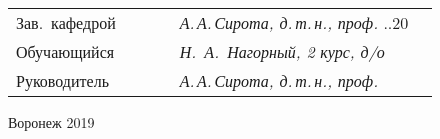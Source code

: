 \begin{titlepage}
\begin{arial}
\begin{tabularx}{\textwidth}{llllll}
Зав.~кафедрой & \hspace{0.2mm} & \underline{\hspace{25mm}} & \hspace{0.2mm} & \textit{А.\,А.\,Сирота, д.\,т.\,н., проф.} \hspace{0.4mm} \underline{\hspace{5mm}}.\underline{\hspace{5mm}}.20\underline{\hspace{5mm}} \\
Обучающийся & \hspace{0.2mm} & \underline{\hspace{25mm}} & \hspace{0.2mm} & \textit{Н.~А.~Нагорный, 2 курс, д/о} \hspace{2mm} \\
Руководитель & \hspace{0.2mm} & \underline{\hspace{25mm}} & \hspace{0.2mm} & \textit{А.\,А.\,Сирота, д.\,т.\,н., проф.} \\
\end{tabularx}

\vspace*{\fill}

Воронеж 2019
\endgroup
\end{arial}
\end{titlepage}

\setcounter{page}{2}
